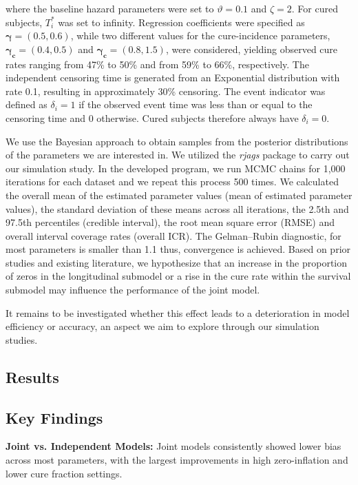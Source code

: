 \documentclass[twoside]{article}
\begin{document}
where the baseline hazard parameters were set to \( \vartheta = 0.1 \) and \( \zeta = 2 \). For cured subjects, \( T_i^* \) was set to infinity. Regression coefficients were specified as \( \bm{\gamma} = (0.5, 0.6) \), while two different values for the cure-incidence parameters, \( \bm{\gamma_c} = (0.4, 0.5) \) and \( \bm{\gamma_c} = (0.8, 1.5) \), were considered, yielding observed cure rates ranging from 47\% to 50\% and from 59\% to 66\%, respectively. The independent censoring time is generated from an Exponential distribution with rate 0.1, resulting in approximately 30\% censoring. The event indicator was defined as \( \delta_i = 1 \) if the observed event time was less than or equal to the censoring time and 0 otherwise. Cured subjects therefore always have \( \delta_i = 0 \).

We use the Bayesian approach to obtain samples from the posterior distributions of the parameters we are interested in. We utilized the \textit{rjags} package to carry out our simulation study. In the developed program, we run MCMC chains for 1,000 iterations for each dataset and we repeat this process 500 times. We calculated the overall mean of the estimated parameter values (mean of estimated parameter values), the standard deviation of these means across all iterations, the 2.5th and 97.5th percentiles (credible interval), the root mean square error (RMSE) and overall interval coverage rates (overall ICR). The Gelman–Rubin diagnostic, for most parameters is smaller than 1.1 thus, convergence is achieved. Based on prior studies and existing literature, we hypothesize that an increase in the proportion of zeros in the longitudinal submodel or a rise in the cure rate within the survival submodel may influence the performance of the joint model.

It remains to be investigated whether this effect leads to a deterioration in model efficiency or accuracy, an aspect we aim to explore through our simulation studies.

\subsection{Results}

\subsection*{Key Findings}

\textbf{Joint vs. Independent Models:} Joint models consistently showed lower bias across most parameters, with the largest improvements in high zero-inflation and lower cure fraction settings.
\end{document}
